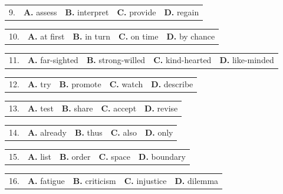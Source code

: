 \documentclass[UTF8,11pt]{ctexart}
\begin{document}
\noindent\begin{tabularx}{\linewidth}{@{}lXXXX@{}}9. & \textbf{A.} assess & \textbf{B.} interpret & \textbf{C.} provide & \textbf{D.} regain\\\end{tabularx}\par

\noindent\begin{tabularx}{\linewidth}{@{}lXXXX@{}}10. & \textbf{A.} at first & \textbf{B.} in turn & \textbf{C.} on time & \textbf{D.} by chance\\\end{tabularx}\par

\noindent\begin{tabularx}{\linewidth}{@{}lXXXX@{}}11. & \textbf{A.} far-sighted & \textbf{B.} strong-willed & \textbf{C.} kind-hearted & \textbf{D.} like-minded\\\end{tabularx}\par

\noindent\begin{tabularx}{\linewidth}{@{}lXXXX@{}}12. & \textbf{A.} try & \textbf{B.} promote & \textbf{C.} watch & \textbf{D.} describe\\\end{tabularx}\par

\noindent\begin{tabularx}{\linewidth}{@{}lXXXX@{}}13. & \textbf{A.} test & \textbf{B.} share & \textbf{C.} accept & \textbf{D.} revise\\\end{tabularx}\par

\noindent\begin{tabularx}{\linewidth}{@{}lXXXX@{}}14. & \textbf{A.} already & \textbf{B.} thus & \textbf{C.} also & \textbf{D.} only\\\end{tabularx}\par

\noindent\begin{tabularx}{\linewidth}{@{}lXXXX@{}}15. & \textbf{A.} list & \textbf{B.} order & \textbf{C.} space & \textbf{D.} boundary\\\end{tabularx}\par

\noindent\begin{tabularx}{\linewidth}{@{}lXXXX@{}}16. & \textbf{A.} fatigue & \textbf{B.} criticism & \textbf{C.} injustice & \textbf{D.} dilemma\\\end{tabularx}\par
\end{document}
